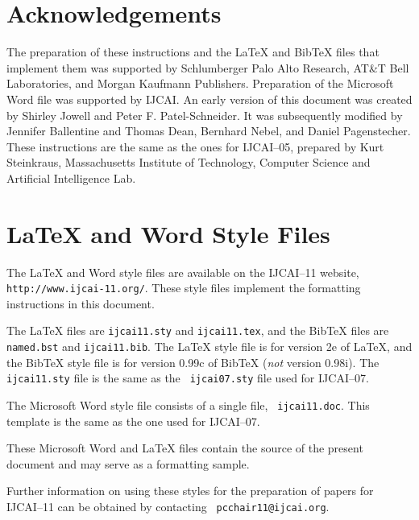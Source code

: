 \documentclass{article}
\begin{document}
\section*{Acknowledgements}

The preparation of these instructions and the \LaTeX{} and Bib\TeX{}
files that implement them was supported by Schlumberger Palo Alto
Research, AT\&T Bell Laboratories, and Morgan Kaufmann Publishers.
Preparation of the Microsoft Word file was supported by IJCAI.  An
early version of this document was created by Shirley Jowell and Peter
F. Patel-Schneider.  It was subsequently modified by Jennifer
Ballentine and Thomas Dean, Bernhard Nebel, and Daniel Pagenstecher.
These instructions are the same as the ones for IJCAI--05, prepared by
Kurt Steinkraus, Massachusetts Institute of Technology, Computer
Science and Artificial Intelligence Lab.

\appendix

\section{\LaTeX{} and Word Style Files}\label{stylefiles}

The \LaTeX{} and Word style files are available on the IJCAI--11
website, {\tt http://www.ijcai-11.org/}.
These style files implement the formatting instructions in this
document.

The \LaTeX{} files are {\tt ijcai11.sty} and {\tt ijcai11.tex}, and
the Bib\TeX{} files are {\tt named.bst} and {\tt ijcai11.bib}. The
\LaTeX{} style file is for version 2e of \LaTeX{}, and the Bib\TeX{}
style file is for version 0.99c of Bib\TeX{} ({\em not} version
0.98i). The {\tt ijcai11.sty} file is the same as the {\tt
ijcai07.sty} file used for IJCAI--07.

The Microsoft Word style file consists of a single file, {\tt
ijcai11.doc}. This template is the same as the one used for
IJCAI--07.

These Microsoft Word and \LaTeX{} files contain the source of the
present document and may serve as a formatting sample.  

Further information on using these styles for the preparation of
papers for IJCAI--11 can be obtained by contacting {\tt
pcchair11@ijcai.org}.



\end{document}
